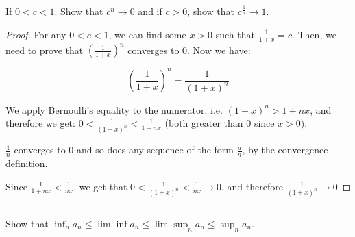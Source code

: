 

\subsection{} If $0 < c < 1$. Show that $c^n \rightarrow 0$ and if $c > 0$, show  that $c^\frac{1}{n} \rightarrow 1$.

\begin{proof}
For any $0<c<1$, we can find some $x>0$ such that $\frac{1}{1+x}=c$. Then, we need to prove that $(\frac{1}{1+x})^n$ converges to 0. Now we have:

\[(\frac{1}{1+x})^n = \frac{1}{(1+x)^n} \]

We apply Bernoulli's equality to the numerator, i.e. $(1+x)^n > 1+nx$, and therefore we get: $0 < \frac{1}{(1+x)^n} < \frac{1}{1+nx}$ (both greater than 0 since $x>0$).

$\frac{1}{n}$ converges to 0 and so does any sequence of the form $\frac{a}{n}$, by the convergence definition. 

Since $\frac{1}{1+nx} < \frac{1}{nx}$, we get that $0 < \frac{1}{(1+x)^n} < \frac{1}{nx} \rightarrow 0$, and therefore $\frac{1}{(1+x)^n} \rightarrow 0$

\end{proof}


\subsection{} Show that $\inf_n a_n \leq \lim \inf a_n \leq \lim \sup_n a_n \leq \sup_n a_n$.

